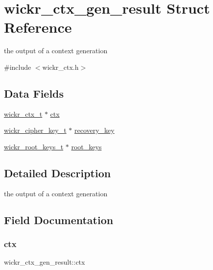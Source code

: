 \hypertarget{structwickr__ctx__gen__result}{}\section{wickr\+\_\+ctx\+\_\+gen\+\_\+result Struct Reference}
\label{structwickr__ctx__gen__result}


the output of a context generation  




{\ttfamily \#include $<$wickr\+\_\+ctx.\+h$>$}

\subsection*{Data Fields}
\begin{DoxyCompactItemize}
\item 
\hyperlink{structwickr__ctx}{wickr\+\_\+ctx\+\_\+t} $\ast$ \hyperlink{structwickr__ctx__gen__result_acf7a49dc829a76f122e2eb88e1ddf5aa}{ctx}
\item 
\hyperlink{structwickr__cipher__key}{wickr\+\_\+cipher\+\_\+key\+\_\+t} $\ast$ \hyperlink{structwickr__ctx__gen__result_a32feaf76def6c13abe0240c6ae669999}{recovery\+\_\+key}
\item 
\hyperlink{structwickr__root__keys}{wickr\+\_\+root\+\_\+keys\+\_\+t} $\ast$ \hyperlink{structwickr__ctx__gen__result_a42600241a65a968de4f84120d9031320}{root\+\_\+keys}
\end{DoxyCompactItemize}


\subsection{Detailed Description}
the output of a context generation 

\subsection{Field Documentation}
\mbox{\label{structwickr__ctx__gen__result_acf7a49dc829a76f122e2eb88e1ddf5aa}} 
\subsubsection{\texorpdfstring{ctx}{ctx}}
{\footnotesize\ttfamily wickr\+\_\+ctx\+\_\+gen\+\_\+result\+::ctx}

